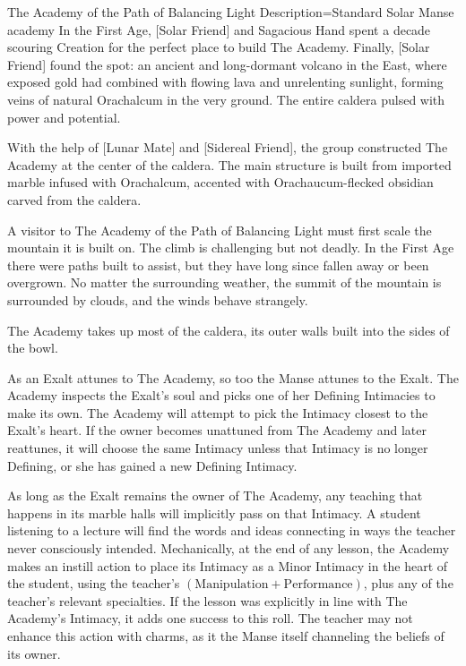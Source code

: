 \begin{Merit}{The Academy of the Path of Balancing Light}{
    Description=Standard Solar Manse
}{academy}
In the First Age, [Solar Friend] and Sagacious Hand spent a decade scouring
Creation for the perfect place to build The Academy. Finally, [Solar Friend]
found the spot: an ancient and long-dormant volcano in the East, where exposed
gold had combined with flowing lava and unrelenting sunlight, forming veins of
natural Orachalcum in the very ground. The entire caldera pulsed with power and
potential.

With the help of [Lunar Mate] and [Sidereal Friend], the group constructed The
Academy at the center of the caldera. The main structure is built from imported
marble infused with Orachalcum, accented with Orachaucum-flecked obsidian
carved from the caldera.

A visitor to The Academy of the Path of Balancing Light must first scale the
mountain it is built on. The climb is challenging but not deadly. In the First
Age there were paths built to assist, but they have long since fallen away or
been overgrown. No matter the surrounding weather, the summit of the mountain
is surrounded by clouds, and the winds behave strangely.

The Academy takes up most of the caldera, its outer walls built into the sides
of the bowl.


As an Exalt attunes to The Academy, so too the Manse attunes to the Exalt. The
Academy inspects the Exalt's soul and picks one of her Defining Intimacies to
make its own. The Academy will attempt to pick the Intimacy closest to the
Exalt's heart. If the owner becomes unattuned from The Academy and later
reattunes, it will choose the same Intimacy unless that Intimacy is no longer
Defining, or she has gained a new Defining Intimacy.

As long as the Exalt remains the owner of The Academy, any teaching that
happens in its marble halls will implicitly pass on that Intimacy. A student
listening to a lecture will find the words and ideas connecting in ways the
teacher never consciously intended. Mechanically, at the end of any lesson, the
Academy makes an instill action to place its Intimacy as a Minor Intimacy in
the heart of the student, using the teacher's $(\mathrm{Manipulation} +
\mathrm{Performance})$, plus any of the teacher's relevant specialties. If the
lesson was explicitly in line with The Academy's Intimacy, it adds one success
to this roll. The teacher may not enhance this action with charms, as it the
Manse itself channeling the beliefs of its owner.
\end{Merit}

